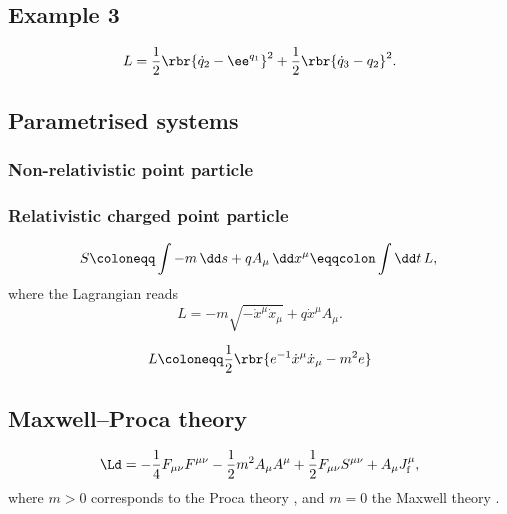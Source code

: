 \documentclass[a4paper,11pt]{article}
\begin{document}
\subsection*{Example 3}

\begin{equation}
L = \frac{1}{2} \rbr{\dot{q}_2 - \ee^{q_1}}^2 + \frac{1}{2} \rbr{\dot{q}_3 - 
q_2}^2.
\end{equation}



\subsection{Parametrised systems}

\subsubsection*{Non-relativistic point particle}

\subsubsection*{Relativistic charged point particle}

\cite[sec.\ 15]{Landau1975}
\begin{equation}
S \coloneqq \int -m\,\dd s + q A_\mu \,\dd x^\mu \eqqcolon \int\dd t\, L,\\
\label{eq:point-charged}
\end{equation}
where the Lagrangian reads
\begin{equation}
L = -m \sqrt{-\dot{x}^\mu \dot{x}_\mu} + q \dot{x}^\mu A_\mu.
\end{equation}

\cite[sec.\ 2.1]{Blumenhagen2013}
\begin{equation}
L \coloneqq \frac{1}{2} \rbr{e^{-1}\dot{x}^\mu \dot{x}_\mu - m^2 e}
\label{eq:point-aux-lagrangian}
\end{equation}


\subsection{Maxwell--Proca theory}

\begin{equation}
\Ld = -\frac{1}{4} F_{\mu\nu} F^{\mu\nu} - \frac{1}{2}m^2 A_\mu A^\mu + 
\frac{1}{2} F_{\mu\nu} S^{\mu\nu} + A_\mu J^\mu_\text{f},
\end{equation}
where $m > 0$ corresponds to the Proca theory \cite[sec.\ 2.3]{Gitman1990}, and 
$m = 0$ the Maxwell theory \cite[sec.\ 3.3.3]{Rothe2010} \cite[sec.\ 
2.4]{Gitman1990}.
\end{document}

